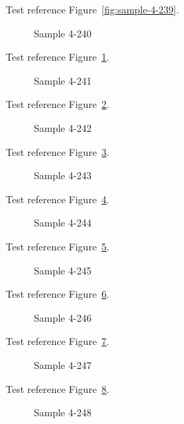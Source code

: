 Test reference Figure~\ref{fig:sample-4-239}.

\begin{figure}[tbhp]
\caption{Sample 4-240}
\label{fig:sample-4-240}
\end{figure}

Test reference Figure~\ref{fig:sample-4-240}.

\begin{figure}[tbhp]
\caption{Sample 4-241}
\label{fig:sample-4-241}
\end{figure}

Test reference Figure~\ref{fig:sample-4-241}.

\begin{figure}[tbhp]
\caption{Sample 4-242}
\label{fig:sample-4-242}
\end{figure}

Test reference Figure~\ref{fig:sample-4-242}.

\begin{figure}[tbhp]
\caption{Sample 4-243}
\label{fig:sample-4-243}
\end{figure}

Test reference Figure~\ref{fig:sample-4-243}.

\begin{figure}[tbhp]
\caption{Sample 4-244}
\label{fig:sample-4-244}
\end{figure}

Test reference Figure~\ref{fig:sample-4-244}.

\begin{figure}[tbhp]
\caption{Sample 4-245}
\label{fig:sample-4-245}
\end{figure}

Test reference Figure~\ref{fig:sample-4-245}.

\begin{figure}[tbhp]
\caption{Sample 4-246}
\label{fig:sample-4-246}
\end{figure}

Test reference Figure~\ref{fig:sample-4-246}.

\begin{figure}[tbhp]
\caption{Sample 4-247}
\label{fig:sample-4-247}
\end{figure}

Test reference Figure~\ref{fig:sample-4-247}.

\begin{figure}[tbhp]
\caption{Sample 4-248}
\label{fig:sample-4-248}
\end{figure}

